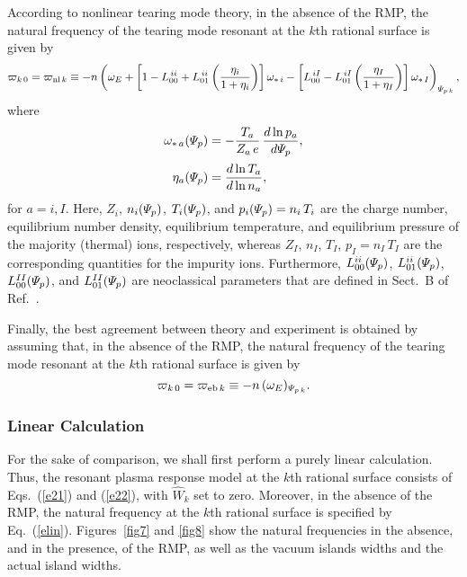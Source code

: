 \documentclass[12pt,prb,aps]{revtex4-1}
\begin{document}
According to nonlinear tearing mode theory, in the absence of the RMP, 
the natural frequency of the tearing mode resonant at the $k$th rational surface is given by\,\cite{rftor}
\begin{equation}
\varpi_{k\,0} = \varpi_{{\rm nl}\,k}\equiv  -n\left(\omega_E +\left[1-L_{00}^{\,ii}+L_{01}^{\,ii}\left(\frac{\eta_i}{1+\eta_i}\right)\right]
\omega_{\ast\,i}
-\left[L_{00}^{\,iI}- L_{01}^{\,iI}\left(\frac{\eta_I}{1+\eta_I}\right)\right]\omega_{\ast\,I}\right)_{{\mit\Psi}_{p\,k}},
\end{equation}
where
\begin{align}
\omega_{\ast\,a}({\mit\Psi}_p) &=-\frac{T_a}{Z_a\,e}\,\frac{d\ln p_a}{d{\mit\Psi}_p},\\[0.5ex]
\eta_a({\mit\Psi}_p)&=\frac{d\ln T_a}{d\ln n_a},
\end{align}
for $a=i, I$. 
Here, $Z_i$, $n_i({\mit\Psi}_p)$, $T_i({\mit\Psi}_p)$, and $p_i({\mit\Psi}_p)=n_i\,T_i$   are the charge number, 
equilibrium number density, 
equilibrium temperature, and equilibrium pressure
of the majority (thermal) ions, respectively,
whereas  $Z_I$, $n_I$, $T_I$, $p_I = n_I\,T_I$
are the corresponding quantities for the impurity ions.  
Furthermore, $L_{00}^{ii}({\mit\Psi}_p)$, $L_{01}^{ii}({\mit\Psi}_p)$,  $L_{00}^{II}({\mit\Psi}_p)$, and $L_{01}^{II}({\mit\Psi}_p)$ are neoclassical parameters that are defined
in Sect.~B of Ref.~. 

Finally, the best agreement between theory and experiment is obtained by assuming that, in the absence of the RMP, the 
 natural frequency of the tearing mode resonant at the $k$th rational surface is given by\,\cite{rftor1,heyn}
\begin{equation}\label{eeb}
\varpi_{k\,0} = \varpi_{{\rm eb}\,k}\equiv -n\,(\omega_E)_{{\mit\Psi}_{p\,k}}.
\end{equation}

\subsubsection{Linear Calculation}
For the sake of comparison, we shall first perform a purely linear calculation. Thus, the
resonant plasma response model at the $k$th rational surface consists of Eqs.~(\ref{e21}) and (\ref{e22}), with
$\hat{W}_k$ set to zero. Moreover, in the absence of the RMP, the natural frequency at the $k$th rational surface is specified by Eq.~(\ref{elin}).
Figures~\ref{fig7} and \ref{fig8} show the natural frequencies in the absence, and in the presence, of the RMP, as well as the vacuum
islands widths and the actual island widths. 
\end{document}

